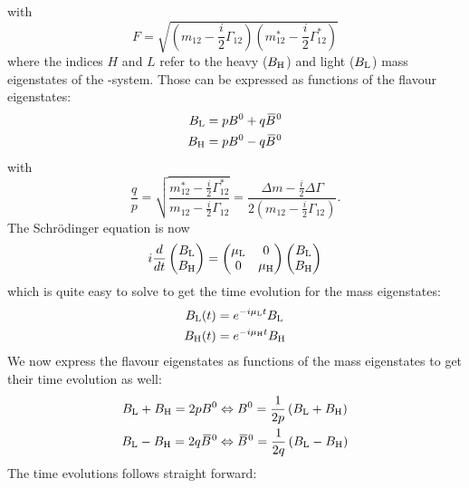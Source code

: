 with
\begin{equation}
    F = \sqrt{\left(m_{12}-\frac{i}{2}\Gamma_{12}\right)\left(m_{12}^*-\frac{i}{2}\Gamma_{12}^*\right)}
\end{equation}
where the indices $H$ and $L$ refer to the heavy ($B_{\text{H}}$) and light ($B_{\text{L}}$) mass eigenstates of the \B-system. Those can be expressed as functions
of the flavour eigenstates:
\begin{align}
    B_{\text{L}} &= pB^0 + q {\kern 0.18em\overline{\kern -0.18em B}{}{}^{\kern 0.06em 0}}\\
    B_{\text{H}} &= pB^0 - q {\kern 0.18em\overline{\kern -0.18em B}{}{}^{\kern 0.06em 0}}
\end{align}
with
\begin{equation}
    \frac{q}{p} = \sqrt{\frac{m_{12}^*-\frac{i}{2}\Gamma_{12}^*}{m_{12}-\frac{i}{2}\Gamma_{12}}}
    = \frac{\Delta m-\frac{i}{2}\Delta\Gamma}{2\left(m_{12}-\frac{i}{2}\Gamma_{12}\right)}.
\end{equation}
The Schrödinger equation is now
\begin{equation}
    i\frac{d}{dt}\begin{pmatrix} B_{\text{L}} \\ B_{\text{H}} \end{pmatrix} = \begin{pmatrix} \mu_{\text{L}} & 0 \\ 0 & \mu_{\text{H}} \end{pmatrix}
    \begin{pmatrix} B_{\text{L}} \\ B_{\text{H}} \end{pmatrix}
\end{equation}
which is quite easy to solve to get the time evolution for the mass eigenstates:
\begin{align}
    B_{\text{L}}(t) &= e^{-i\mu_{\text{L}}t}B_{\text{L}}\\
    B_{\text{H}}(t) &= e^{-i\mu_{\text{H}}t}B_{\text{H}}
\end{align}
We now express the flavour eigenstates as functions of the mass eigenstates to get their time evolution as well:
\begin{align}
    B_{\text{L}}+B_{\text{H}} = 2pB^0 &\Leftrightarrow B^0 = \frac{1}{2p}\left(B_{\text{L}} + B_{\text{H}}\right)\\
    B_{\text{L}}-B_{\text{H}} = 2q{\kern 0.18em\overline{\kern -0.18em B}{}{}^{\kern 0.06em 0}} &\Leftrightarrow {\ensuremath{\kern 0.18em\overline{\kern -0.18em B}{}{}^{\kern 0.06em 0}}} = \frac{1}{2q}\left(B_{\text{L}} - B_{\text{H}}\right)
\end{align}
The time evolutions follows straight forward:
